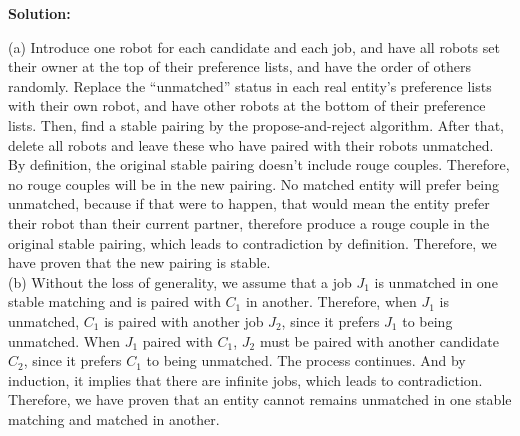 \documentclass[12pt]{article}
\newenvironment{solution}{\par\noindent\textbf{Solution:}\par}{\par\vspace{1em}}
\begin{document}
\begin{solution}
    \noindent
    (a) Introduce one robot for each candidate and each job, and have all robots set their owner at the top of their preference lists, and have the order of others randomly.
    Replace the ``unmatched'' status in each real entity's preference lists with their own robot, and have other robots at the bottom of their preference lists. 
    Then, find a stable pairing by the propose-and-reject algorithm.
    After that, delete all robots and leave these who have paired with their robots unmatched.
    By definition, the original stable pairing doesn't include rouge couples.
    Therefore, no rouge couples will be in the new pairing. 
    No matched entity will prefer being unmatched,
    because if that were to happen, that would mean the entity prefer their robot than their current partner, therefore produce a rouge couple in the original stable pairing, which leads to contradiction by definition.
    Therefore, we have proven that the new pairing is stable.\\
    (b) Without the loss of generality, we assume that a job $J_1$ is unmatched in one stable matching and is paired with $C_1$ in another.
    Therefore, when $J_1$ is unmatched, $C_1$ is paired with another job $J_2$, since it prefers $J_1$ to being unmatched.
    When $J_1$ paired with $C_1$, $J_2$ must be paired with another candidate $C_2$, since it prefers $C_1$ to being unmatched.
    The process continues. And by induction, it implies that there are infinite jobs, which leads to contradiction.
    Therefore, we have proven that an entity cannot remains unmatched in one stable matching and matched in another.
\end{solution}
\end{document}
